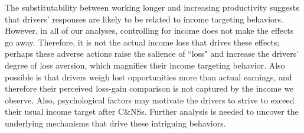 \documentclass[reviewmode]{restud}
\begin{document}
The substitutability between working longer and increasing productivity suggests that drivers' responses are likely to be related to income targeting behaviors. However, in all of our analyses, controlling for income does not make the effects go away. Therefore, it is not the actual income loss that drives these effects; perhaps these adverse actions raise the salience of ``loss" and increase the drivers' degree of loss aversion, which magnifies their income targeting behavior. Also possible is that drivers weigh lost opportunities more than actual earnings, and therefore their perceived loss-gain comparison is not captured by the income we observe. Also, psychological factors may motivate the drivers to strive to exceed their usual income target after C\&NSs. Further analysis is needed to uncover the underlying mechanisms that drive these intriguing behaviors.



\end{document}
